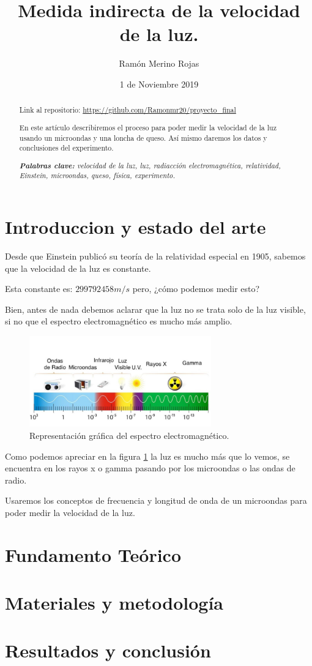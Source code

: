 \documentclass{article}
\title{Medida indirecta de la velocidad de la luz.}
\author{Ramón Merino Rojas}
\date{1 de Noviembre 2019}
\begin{document}
\maketitle

\begin{abstract}
Link al repositorio: \href{https://github.com/Ramonmr20/proyecto_final}{https://github.com/Ramonmr20/proyecto\_final}

En este artículo describiremos el proceso para poder medir la velocidad de la luz usando un microondas y una loncha de queso. Así mismo daremos los datos y conclusiones del experimento.

\textit{\textbf{Palabras clave:} velocidad de la luz, luz, radiacción electromagnética, relatividad, Einstein, microondas, queso, física, experimento.}
\end{abstract}


\tableofcontents

\section{Introduccion y estado del arte}
Desde que Einstein publicó su teoría de la relatividad especial en 1905, sabemos que la velocidad de la luz es constante. \cite{Paterna1971}

Esta constante es: $299 792 458 m/s$ pero, ¿cómo podemos medir esto?

Bien, antes de nada debemos aclarar que la luz no se trata solo de la luz visible, si no que el espectro electromagnético es mucho más amplio.


\begin{figure}
    \centering
    \includegraphics[width = 0.7\textwidth]{espectro}
    \caption{Representación gráfica del espectro electromagnético.}
    \label{fig:espectro}
\end{figure}

Como podemos apreciar en la figura \ref{fig:espectro} la luz es mucho más que lo vemos, se encuentra en los rayos x o gamma pasando por los microondas o las ondas de radio.

Usaremos los conceptos de frecuencia y longitud de onda de un microondas para poder medir la velocidad de la luz.
\section{Fundamento Teórico}

\section{Materiales y metodología}

\section{Resultados y conclusión}



\end{document}
